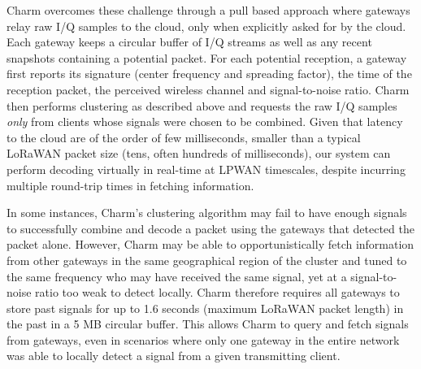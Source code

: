  Charm overcomes these challenge through
a pull based approach where gateways relay raw I/Q samples to the cloud, only
when explicitly asked for by the cloud. Each gateway keeps a circular buffer
of I/Q streams as well as any recent snapshots containing a potential packet.
For each potential reception, a gateway first reports its signature (center
frequency and spreading factor), the time of the reception packet, the
perceived wireless channel and signal-to-noise ratio. Charm then performs
clustering as described above and requests the raw I/Q samples {\it only }
from clients whose signals were chosen to be combined. Given that latency to
the cloud are of the order of few milliseconds, smaller than a typical LoRaWAN
packet size (tens, often hundreds of milliseconds), our system can perform
decoding virtually in real-time at LPWAN timescales, despite incurring
multiple round-trip times in fetching information.

 In some instances, Charm's
clustering algorithm may fail to have enough signals to successfully combine
and decode a packet using the gateways that detected the packet alone.
However, Charm may be able to opportunistically fetch information from other
gateways in the same geographical region of the cluster and tuned to the same
frequency who may have received the same signal, yet at a signal-to-noise
ratio too weak to detect locally. Charm therefore requires all gateways to
store past signals for up to 1.6 seconds (maximum LoRaWAN packet length) in
the past in a 5 MB circular buffer. This allows Charm to query and fetch
signals from gateways, even in scenarios where only one gateway in the entire
network was able to locally detect a signal from a given transmitting client.